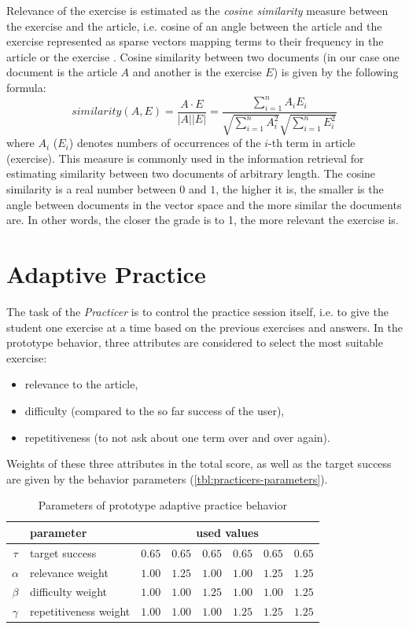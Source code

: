 \documentclass[12pt, twoside]{fithesis2}		%
\renewcommand{\_}{\leavevmode \kern0.07em\vbox{\hrule width0.4em}}
\newcommand{\squarebullet}{\textcolor{black}{\raisebox{0.15em}{\rule{4pt}{4pt}}}}
\newcommand{\emptysquarebullet}{\textcolor{black}{\raisebox{0.10em}{\tiny$\square$}}}
\newenvironment{myItemize}{
  \begin{itemize}[leftmargin=2em,rightmargin=1em,itemsep=\parskip ,parsep=0em,topsep=0em,partopsep=0em]
  \renewcommand{\labelitemi}{\squarebullet}
  \renewcommand{\labelitemii}{\textbullet}
}{
  \end{itemize}
}
\begin{document}
Relevance of the exercise is estimated as the \textit{cosine similarity} measure between the exercise and the article,
i.e. cosine of an angle between the article and the exercise represented as sparse vectors mapping terms to their frequency in the article or the exercise
\cite[][121]{information-retrieval}.
Cosine similarity between two documents (in our case one document is the article $A$ and another is the exercise $E$) is given by the following formula:
$$
similarity(A, E)
= \frac{A \cdot E}{|A| |E|}
= \frac{\sum_{i=1}^{n} A_i E_i}{\sqrt{\sum_{i=1}^{n} A_i^2}\sqrt{\sum_{i=1}^{n} E_i^2}}
$$
where $A_i$ ($E_i$) denotes numbers of occurrences of the $i$-th term in article (exercise).
This measure is commonly used in the information retrieval for estimating similarity between two documents of arbitrary length. The cosine similarity is a real number between $0$ and $1$, the higher it is, the smaller is the angle between documents in the vector space and the more similar the documents are.
In other words, the closer the grade is to 1, the more relevant the exercise is.


\section{Adaptive Practice}
\label{sec:smartoo-practice}

The task of the \textit{Practicer} is to control the practice session itself, i.e. to give the student one exercise at a time based on the previous exercises and answers.
In the prototype behavior, three attributes are considered to select the most suitable exercise:
\begin{myItemize}
  \item relevance to the article,
  \item difficulty (compared to the so far success of the user),
  \item repetitiveness (to not ask about one term over and over again).
\end{myItemize}
Weights of these three attributes in the total score, as well as the target success
are given by the behavior parameters (\autoref{tbl:practicers-parameters}).
\begin{table}[h]
\begin{center}
\begin{tabular}{| c | l | r | r |  r  |  r |  r | r |}
  \hline
           & parameter & \multicolumn{6}{c|}{used values} \\
  \hline
  $\tau$   & target success        & $0.65$ & $0.65$ & $0.65$ & $0.65$ & $0.65$ & $0.65$\\
  $\alpha$ & relevance weight      & $1.00$ & $1.25$ & $1.00$ & $1.00$ & $1.25$ & $1.25$\\
  $\beta$  & difficulty weight     & $1.00$ & $1.00$ & $1.25$ & $1.00$ & $1.00$ & $1.25$\\
  $\gamma$ & repetitiveness weight & $1.00$ & $1.00$ & $1.00$ & $1.25$ & $1.25$ & $1.25$\\
  \hline
\end{tabular}
\end{center}
\caption{Parameters of prototype adaptive practice behavior}
\label{tbl:practicers-parameters}
\end{table}
\end{document}
